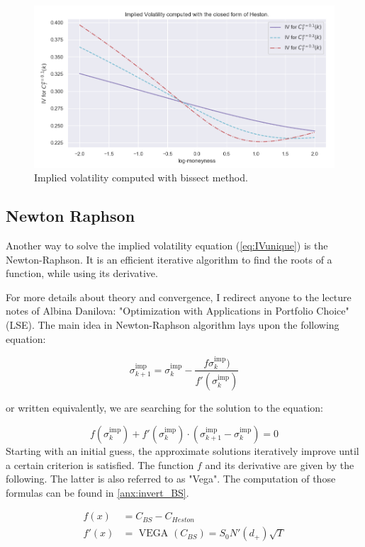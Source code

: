 \begin{figure}
\centering
   \includegraphics[width = 0.75 \textwidth]{../addition_part/images/integration_fft/Heston_IV.png}
   \caption{Implied volatility computed with bissect method.}
   \label{fig:iv_bissect}
\end{figure}











\subsection{Newton Raphson}
Another way to solve the implied volatility equation  (\ref{eq:IVunique}) is the Newton-Raphson. It is an efficient iterative algorithm to find the roots of a function, while using its derivative.

For more details about theory and convergence, I redirect anyone to the lecture notes of Albina Danilova: "Optimization with Applications in Portfolio Choice" (LSE). The main idea in Newton-Raphson algorithm lays upon the following equation:

$$ \sigma^{ \text{imp} }_{k+1} = \sigma^{ \text{imp} }_{k} - \frac{f\sigma^{ \text{imp} }_{k})}{  f'(\sigma^{ \text{imp} }_{k})} $$

or written equivalently, we are searching for the solution to the equation: 

$$ f(\sigma^{ \text{imp} }_{k}) + f'(\sigma^{ \text{imp} }_{k}) \cdot (\sigma^{ \text{imp} }_{k+1} -\sigma^{ \text{imp} }_{k} ) = 0 $$
Starting with an initial guess, the approximate solutions iteratively improve until a certain criterion is satisfied. The function $f$ and its derivative are given by the following. The latter is also referred to as "Vega". The computation of those formulas can be found in \ref{anx:invert_BS}.

\begin{align*}
f(x) &= C_{BS} - C_{Heston} \\
f'(x) &= \text{ VEGA } (C_{BS}) = S_0 N'(d_+)\sqrt{T}
\end{align*}



